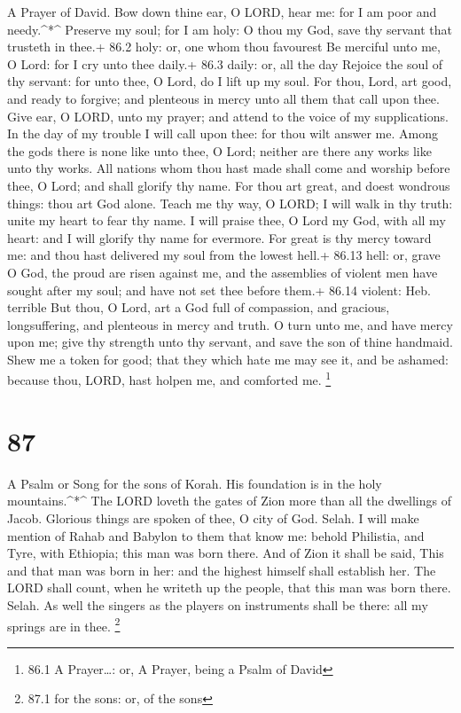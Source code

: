 A Prayer of David.  Bow down thine ear, O LORD, hear me: for
I am poor and needy.\^{}*\^{}  Preserve my soul; for I am
holy: O thou my God, save thy servant that trusteth in thee.+ 86.2 holy:
or, one whom thou favourest  Be merciful unto me, O Lord:
for I cry unto thee daily.+ 86.3 daily: or, all the day 
Rejoice the soul of thy servant: for unto thee, O Lord, do I lift up my
soul.  For thou, Lord, art good, and ready to forgive; and
plenteous in mercy unto all them that call upon thee.  Give
ear, O LORD, unto my prayer; and attend to the voice of my
supplications.  In the day of my trouble I will call upon
thee: for thou wilt answer me.  Among the gods there is none
like unto thee, O Lord; neither are there any works like unto thy works.
 All nations whom thou hast made shall come and worship
before thee, O Lord; and shall glorify thy name.  For thou
art great, and doest wondrous things: thou art God alone. 
Teach me thy way, O LORD; I will walk in thy truth: unite my heart to
fear thy name.  I will praise thee, O Lord my God, with all
my heart: and I will glorify thy name for evermore.  For
great is thy mercy toward me: and thou hast delivered my soul from the
lowest hell.+ 86.13 hell: or, grave  O God, the proud are
risen against me, and the assemblies of violent men have sought after my
soul; and have not set thee before them.+ 86.14 violent: Heb. terrible
 But thou, O Lord, art a God full of compassion, and
gracious, longsuffering, and plenteous in mercy and truth. 
O turn unto me, and have mercy upon me; give thy strength unto thy
servant, and save the son of thine handmaid.  Shew me a
token for good; that they which hate me may see it, and be ashamed:
because thou, LORD, hast holpen me, and comforted me. \footnote{86.1 A
  Prayer\ldots: or, A Prayer, being a Psalm of David}

\hypertarget{section-86}{%
\section{87}\label{section-86}}

A Psalm or Song for the sons of Korah.  His foundation is in
the holy mountains.\^{}*\^{}  The LORD loveth the gates of
Zion more than all the dwellings of Jacob.  Glorious things
are spoken of thee, O city of God. Selah.  I will make
mention of Rahab and Babylon to them that know me: behold Philistia, and
Tyre, with Ethiopia; this man was born there.  And of Zion
it shall be said, This and that man was born in her: and the highest
himself shall establish her.  The LORD shall count, when he
writeth up the people, that this man was born there. Selah. 
As well the singers as the players on instruments shall be there: all my
springs are in thee. \footnote{87.1 for the sons: or, of the sons}

